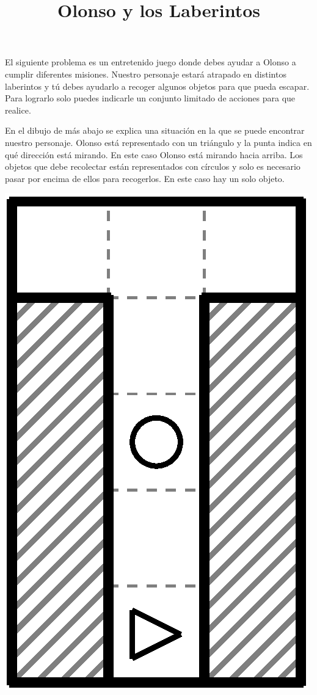 \documentclass{oci}
\title{Olonso y los Laberintos}
\begin{document}
\begin{problemDescription}
  El siguiente problema es un entretenido juego donde debes ayudar a Olonso a cumplir diferentes misiones.
  Nuestro personaje estará atrapado en distintos laberintos y tú debes ayudarlo a recoger algunos objetos para que pueda escapar.
  Para lograrlo solo puedes indicarle un conjunto limitado de acciones para que realice.
  
En el dibujo de más abajo se explica una situación en la que se puede encontrar nuestro personaje.
  Olonso está representado con un triángulo y la punta indica en qué dirección está mirando.
En este caso Olonso está mirando hacia arriba.
Los objetos que debe recolectar están representados con círculos y solo es necesario pasar por encima de ellos para recogerlos.
En este caso hay un solo objeto.

\begin{center}
\includegraphics[angle=90,scale=0.5]{laberintos/ejemplo1-1.eps}
\end{center}


\end{problemDescription}
\end{document}
